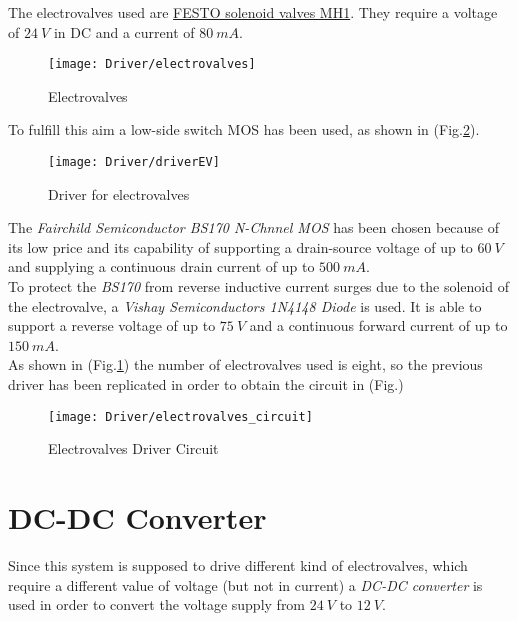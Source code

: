 The electrovalves used are \href{http://www.festo.com/net/SupportPortal/Files/10026/MH1_VO_ENUS.pdf}{FESTO solenoid valves MH1}. They require a voltage of $24\ V$ in DC and a current of $80\ mA$.\\

\begin{figure}[h]
	\centering
	\texttt{[image: Driver/electrovalves]}
	\caption{Electrovalves}
	\label{Fig:EV}
\end{figure}

To fulfill this aim a low-side switch MOS has been used, as shown in (Fig.\ref{Fig:driverEV}).

\begin{figure}[h]
	\centering
	\texttt{[image: Driver/driverEV]}
	\caption{Driver for electrovalves}
	\label{Fig:driverEV}
\end{figure}

The \textit{Fairchild Semiconductor BS170 N-Chnnel MOS} has been chosen because of its low price and its capability of supporting a drain-source voltage of up to $60\ V$ and supplying a continuous drain current of up to $500\ mA$.\\

To protect the \textit{BS170} from reverse inductive current surges due to the solenoid of the electrovalve, a \textit{Vishay Semiconductors 1N4148 Diode} is used. It is able to support  a reverse voltage of up to $75\ V$ and a continuous forward current of up to $150\ mA$.\\

As shown in (Fig.\ref{Fig:EV}) the number of electrovalves used is eight, so the previous driver has been replicated in order to obtain the circuit in (Fig.)

\begin{figure}[h]
	\centering
	\texttt{[image: Driver/electrovalves\_circuit]}
	\caption{Electrovalves Driver Circuit}
	\label{Fig:electrovalves_circuit}
\end{figure}

\section{DC-DC Converter}

Since this system is supposed to drive different kind of electrovalves, which require a different value of voltage (but not in current) a \textit{DC-DC converter} is used in order to convert the voltage supply from $24\ V$ to $12\ V$. \\

